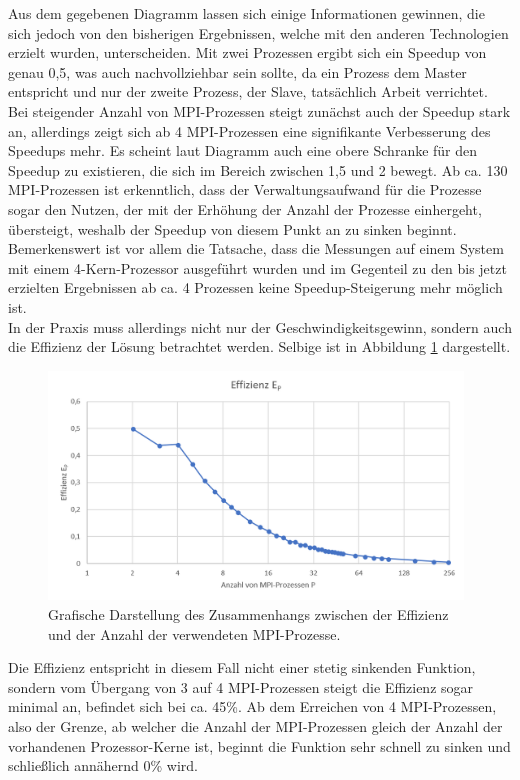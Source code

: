 \begin{description}
						Aus dem gegebenen Diagramm lassen sich einige Informationen gewinnen, die sich jedoch von den bisherigen Ergebnissen, welche mit den anderen Technologien erzielt wurden, unterscheiden. Mit zwei Prozessen ergibt sich ein Speedup von genau 0,5, was auch nachvollziehbar sein sollte, da ein Prozess dem Master entspricht und nur der zweite Prozess, der Slave, tatsächlich Arbeit verrichtet. Bei steigender Anzahl von MPI-Prozessen steigt zunächst auch der Speedup stark an, allerdings zeigt sich ab 4 MPI-Prozessen eine signifikante Verbesserung des Speedups mehr. Es scheint laut Diagramm auch eine obere Schranke für den Speedup zu existieren, die sich im Bereich zwischen 1,5 und 2 bewegt. Ab ca. 130 MPI-Prozessen ist erkenntlich, dass der Verwaltungsaufwand für die Prozesse sogar den Nutzen, der mit der Erhöhung der Anzahl der Prozesse einhergeht, übersteigt, weshalb der Speedup von diesem Punkt an zu sinken beginnt.\\
						Bemerkenswert ist vor allem die Tatsache, dass die Messungen auf einem System mit einem 4-Kern-Prozessor ausgeführt wurden und im Gegenteil zu den bis jetzt erzielten Ergebnissen ab ca. 4 Prozessen keine Speedup-Steigerung mehr möglich ist.\\
						In der Praxis muss allerdings nicht nur der Geschwindigkeitsgewinn, sondern auch die Effizienz der Lösung betrachtet werden. Selbige ist in Abbildung \ref{fig:Effizienz_MPI} dargestellt.
						
						\begin{figure}
							\centering	
							\includegraphics[width=11cm]{Abbildungen/Effizienz_MPI.png}
							\caption{Grafische Darstellung des Zusammenhangs zwischen der Effizienz und der Anzahl der verwendeten MPI-Prozesse.}
							\label{fig:Effizienz_MPI}
						\end{figure}
						
						Die Effizienz entspricht in diesem Fall nicht einer stetig sinkenden Funktion, sondern vom Übergang von 3 auf 4 MPI-Prozessen steigt die Effizienz sogar minimal an, befindet sich bei ca. 45\%. Ab dem Erreichen von 4 MPI-Prozessen, also der Grenze, ab welcher die Anzahl der MPI-Prozessen gleich der Anzahl der vorhandenen Prozessor-Kerne ist, beginnt die Funktion sehr schnell zu sinken und schließlich annähernd 0\% wird.
						

\end{description}
